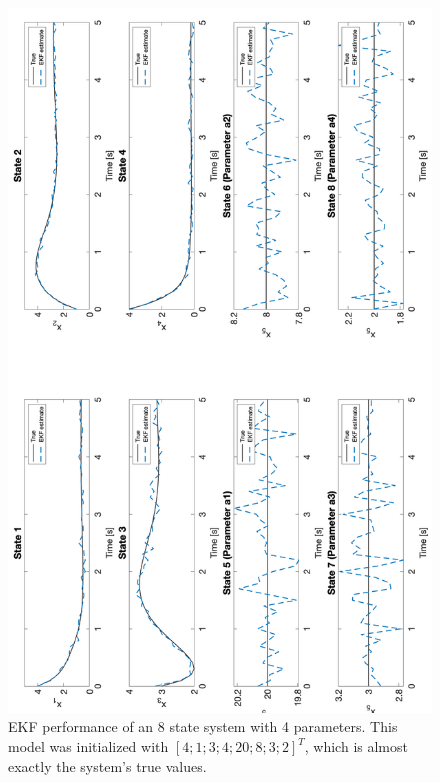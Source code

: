 \begin{figure}[ht]
    \centering
    \includegraphics[scale = 0.5]{EKF_4param.png}
    \caption{EKF performance of an 8 state system with 4 parameters. This model was initialized with $[4;1;3;4;20;8;3;2]^T$, which is almost exactly the system's true values.}
    \label{fig:4param}
\end{figure}






